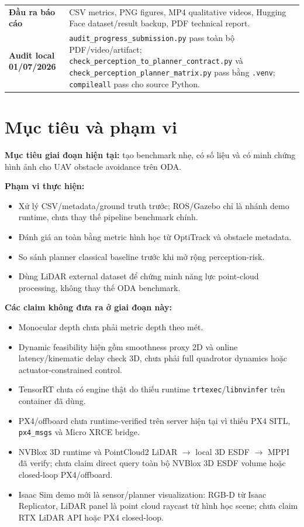 \documentclass[10pt,a4paper]{article}
\newcommand{\code}[1]{\texttt{#1}}
\begin{document}
\begin{table}[H]
\begin{tabularx}{0.98\linewidth}{>{\bfseries}p{3.5cm} X}
Đầu ra báo cáo & CSV metrics, PNG figures, MP4 qualitative videos, Hugging Face dataset/result backup, PDF technical report. \\
Audit local 01/07/2026 & \code{audit\_progress\_submission.py} pass toàn bộ PDF/video/artifact; \code{check\_perception\_to\_planner\_contract.py} và \code{check\_perception\_planner\_matrix.py} pass bằng \code{.venv}; \code{compileall} pass cho source Python. \\
\bottomrule
\end{tabularx}
\end{table}

\section{Mục tiêu và phạm vi}

\textbf{Mục tiêu giai đoạn hiện tại:} tạo benchmark nhẹ, có số liệu và có minh chứng hình ảnh cho UAV obstacle avoidance trên ODA.

\textbf{Phạm vi thực hiện:}
\begin{itemize}
  \item Xử lý CSV/metadata/ground truth trước; ROS/Gazebo chỉ là nhánh demo runtime, chưa thay thế pipeline benchmark chính.
  \item Đánh giá an toàn bằng metric hình học từ OptiTrack và obstacle metadata.
  \item So sánh planner classical baseline trước khi mở rộng perception-risk.
  \item Dùng LiDAR external dataset để chứng minh năng lực point-cloud processing, không thay thế ODA benchmark.
\end{itemize}

\textbf{Các claim không đưa ra ở giai đoạn này:}
\begin{itemize}
  \item Monocular depth chưa phải metric depth theo mét.
  \item Dynamic feasibility hiện gồm smoothness proxy 2D và online latency/kinematic delay check 3D, chưa phải full quadrotor dynamics hoặc actuator-constrained control.
  \item TensorRT chưa có engine thật do thiếu runtime \code{trtexec}/\code{libnvinfer} trên container đã dùng.
  \item PX4/offboard chưa runtime-verified trên server hiện tại vì thiếu PX4 SITL, \code{px4\_msgs} và Micro XRCE bridge.
  \item NVBlox 3D runtime và PointCloud2 LiDAR \(\rightarrow\) local 3D ESDF \(\rightarrow\) MPPI đã verify; chưa claim direct query toàn bộ NVBlox 3D ESDF volume hoặc closed-loop PX4/offboard.
  \item Isaac Sim demo mới là sensor/planner visualization: RGB-D từ Isaac Replicator, LiDAR panel là point cloud raycast từ hình học scene; chưa claim RTX LiDAR API hoặc PX4 closed-loop.
\end{itemize}
\end{document}

